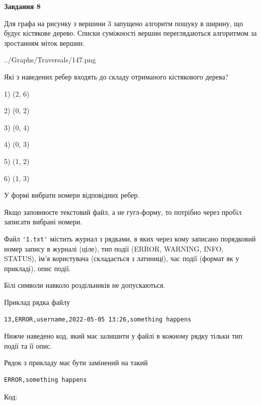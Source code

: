 \documentclass[12pt, ukrainian]{article}
\def\code#1{\Verb!#1!}
\begin{document}
{\begin {large}
{\begin {center}\textbf{Завдання 8}\end {center}}\par
Для графа на рисунку з вершини 3 запущено алгоритм пошуку в ширину, що будує кістякове дерево. Списки суміжності вершин переглядаються алгоритмом за зростанням міток вершин.\par
\begin{center}
	{../Graphs/Traversals/147.png}
\end{center}
\par Які з наведених ребер входять до складу отриманого кістякового дерева?\par
1) (2, 6)\par
2) (0, 2)\par
3) (0, 4)\par
4) (0, 3)\par
5) (1, 2)\par
6) (1, 3)\par
{\vskip 15pt} У формі вибрати номери відповідних ребер.


Якщо заповнюєте текстовий файл, а не гугл-форму, то потрібно через пробіл записа\-ти вибрані номери.\par
\newpage


Файл \code{'1.txt'} містить журнал з рядками, в яких через кому записано поряд\-ко\-вий номер запису в журналі (ціле), тип події (ERROR, WARNING, INFO, STATUS), ім'я користувача (складається з латиниці), час події (фор\-мат як у прикладі), опис події.

Білі символи навколо роздільників не допускаються.

Приклад рядка файлу



\begin{verbatim}
13,ERROR,username,2022-05-05 13:26,something happens
\end{verbatim}


Нижче наведено код, який має залишити у файлі в кожному рядку тільки тип події та її опис.

Рядок з прикладу має бути замінений на такий



\begin{verbatim}
ERROR,something happens
\end{verbatim}




Код:




\end{large}}
\end{document}
